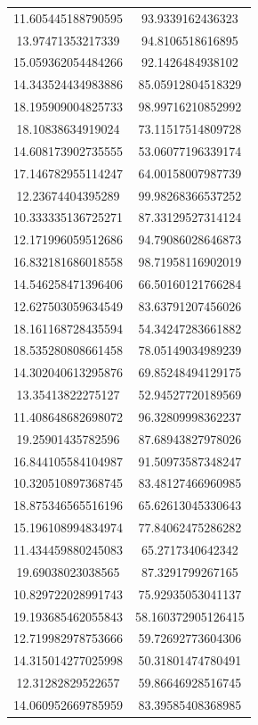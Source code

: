 \begin{table}
\begin{tabular}{cc}
11.605445188790595 & 93.9339162436323 \\
13.97471353217339 & 94.8106518616895 \\
15.059362054484266 & 92.1426484938102 \\
14.343524434983886 & 85.05912804518329 \\
18.195909004825733 & 98.99716210852992 \\
18.10838634919024 & 73.11517514809728 \\
14.608173902735555 & 53.06077196339174 \\
17.146782955114247 & 64.00158007987739 \\
12.23674404395289 & 99.98268366537252 \\
10.333335136725271 & 87.33129527314124 \\
12.171996059512686 & 94.79086028646873 \\
16.832181686018558 & 98.71958116902019 \\
14.546258471396406 & 66.50160121766284 \\
12.627503059634549 & 83.63791207456026 \\
18.161168728435594 & 54.34247283661882 \\
18.535280808661458 & 78.05149034989239 \\
14.302040613295876 & 69.85248494129175 \\
13.35413822275127 & 52.94527720189569 \\
11.408648682698072 & 96.32809998362237 \\
19.25901435782596 & 87.68943827978026 \\
16.844105584104987 & 91.50973587348247 \\
10.320510897368745 & 83.48127466960985 \\
18.875346565516196 & 65.62613045330643 \\
15.196108994834974 & 77.84062475286282 \\
11.434459880245083 & 65.2717340642342 \\
19.69038023038565 & 87.3291799267165 \\
10.829722028991743 & 75.92935053041137 \\
19.193685462055843 & 58.160372905126415 \\
12.719982978753666 & 59.72692773604306 \\
14.315014277025998 & 50.31801474780491 \\
12.31282829522657 & 59.86646928516745 \\
14.060952669785959 & 83.39585408368985 \\

\end{tabular}
\end{table}
